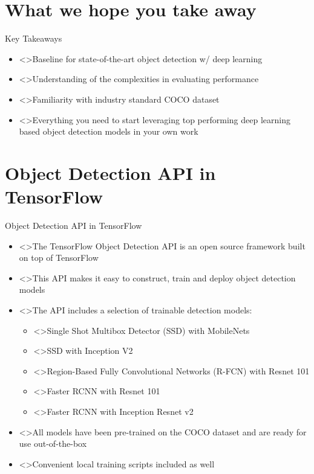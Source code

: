 \documentclass[handout]{beamer}
\begin{document}
\section{What we hope you take away}
\begin{frame}{Key Takeaways }
\begin{itemize}
\itemsep 1em
	\item<>Baseline for state-of-the-art object detection w/ deep learning
	\item<>Understanding of the complexities in evaluating performance
	\item<>Familiarity with industry standard COCO dataset
	\item<>Everything you need to start leveraging top performing deep learning based object detection models in your own work
\end{itemize}
\end{frame}

\section{Object Detection API in TensorFlow}
\begin{frame}{Object Detection API in TensorFlow}
\begin{itemize}
\itemsep 1em
	\item<>The TensorFlow Object Detection API is an open source framework built on top of TensorFlow
	\item<>This API makes it easy to construct, train and deploy object detection models
	\item<>The API includes a selection of trainable detection models:
	\begin{itemize}[square]
		\item<>Single Shot Multibox Detector (SSD) with MobileNets
		\item<>SSD with Inception V2
		\item<>Region-Based Fully Convolutional Networks (R-FCN) with Resnet 101
		\item<>Faster RCNN with Resnet 101
		\item<>Faster RCNN with Inception Resnet v2
	\end{itemize}
	\item<>All models have been pre-trained on the COCO dataset and are ready for use out-of-the-box
	\item<>Convenient local training scripts included as well
\end{itemize}
\end{frame}
\end{document}
